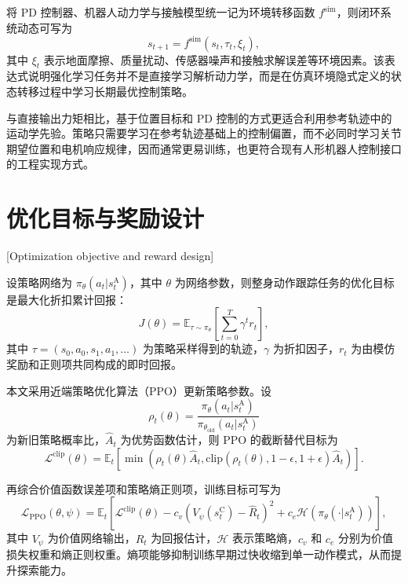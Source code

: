 将 PD 控制器、机器人动力学与接触模型统一记为环境转移函数 $f^{\mathrm{sim}}$，则闭环系统动态可写为
\begin{equation}
s_{t+1}
=
f^{\mathrm{sim}}
\left(
s_t,
\tau_t,
\xi_t
\right),
\end{equation}
其中 $\xi_t$ 表示地面摩擦、质量扰动、传感器噪声和接触求解误差等环境因素。该表达式说明强化学习任务并不是直接学习解析动力学，而是在仿真环境隐式定义的状态转移过程中学习长期最优控制策略。

与直接输出力矩相比，基于位置目标和 PD 控制的方式更适合利用参考轨迹中的运动学先验。策略只需要学习在参考轨迹基础上的控制偏置，而不必同时学习关节期望位置和电机响应规律，因而通常更易训练，也更符合现有人形机器人控制接口的工程实现方式。

\section{优化目标与奖励设计}[Optimization objective and reward design]

设策略网络为 $\pi_\theta(a_t|s_t^{\mathrm{A}})$，其中 $\theta$ 为网络参数，则整身动作跟踪任务的优化目标是最大化折扣累计回报：
\begin{equation}
J(\theta)
=
\mathbb{E}_{\tau\sim\pi_\theta}
\left[
\sum_{t=0}^{T}
\gamma^t r_t
\right],
\end{equation}
其中 $\tau=(s_0,a_0,s_1,a_1,\ldots)$ 为策略采样得到的轨迹，$\gamma$ 为折扣因子，$r_t$ 为由模仿奖励和正则项共同构成的即时回报。

本文采用近端策略优化算法（PPO）更新策略参数\cite{ppo2017}。设
\begin{equation}
\rho_t(\theta)
=
\frac{\pi_\theta(a_t|s_t^{\mathrm{A}})}
{\pi_{\theta_{\mathrm{old}}}(a_t|s_t^{\mathrm{A}})}
\end{equation}
为新旧策略概率比，$\hat{A}_t$ 为优势函数估计，则 PPO 的截断替代目标为
\begin{equation}
\mathcal{L}^{\mathrm{clip}}(\theta)
=
\mathbb{E}_t
\left[
\min
\left(
\rho_t(\theta)\hat{A}_t,
\mathrm{clip}(\rho_t(\theta),1-\epsilon,1+\epsilon)\hat{A}_t
\right)
\right].
\end{equation}

再综合价值函数误差项和策略熵正则项，训练目标可写为
\begin{equation}
\mathcal{L}_{\mathrm{PPO}}(\theta,\psi)
=
\mathbb{E}_t
\left[
\mathcal{L}^{\mathrm{clip}}(\theta)
-c_v\left(V_\psi(s_t^{\mathrm{C}})-\hat{R}_t\right)^2
+c_e\mathcal{H}(\pi_\theta(\cdot|s_t^{\mathrm{A}}))
\right],
\label{eq:ppo_full}
\end{equation}
其中 $V_\psi$ 为价值网络输出，$\hat{R}_t$ 为回报估计，$\mathcal{H}$ 表示策略熵，$c_v$ 和 $c_e$ 分别为价值损失权重和熵正则权重。熵项能够抑制训练早期过快收缩到单一动作模式，从而提升探索能力。

